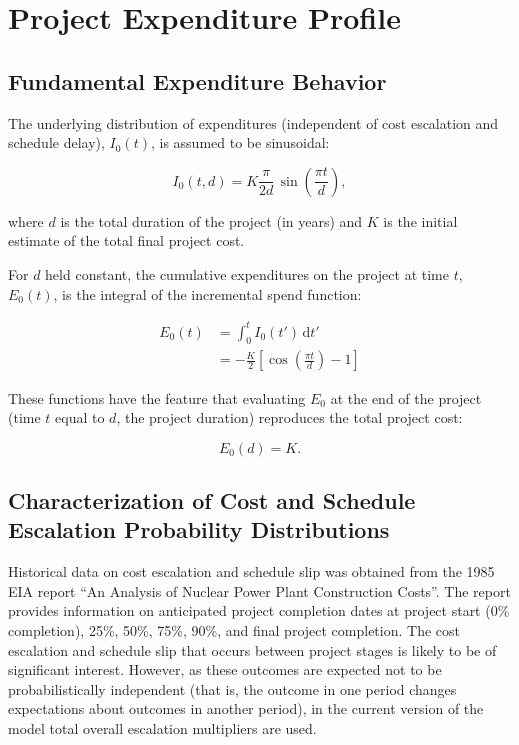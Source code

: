 \documentclass{article}
\begin{document}
\section{Project Expenditure Profile}

\subsection{Fundamental Expenditure Behavior}

The underlying distribution of expenditures (independent of cost escalation and schedule delay), $I_0(t)$, is assumed to be sinusoidal:

\begin{equation}
  I_0(t,d) = K \frac{\pi}{2d} \, \sin\left( \frac{\pi t}{d} \right),
\end{equation}

where $d$ is the total duration of the project (in years) and $K$ is the initial estimate of the total final project cost.

For $d$ held constant, the cumulative expenditures on the project at time $t$, $E_0(t)$, is the integral of the incremental spend function:

\begin{equation} \label{e0-def}
  \begin{split}
    E_0(t) & = \int_0^t {I_0(t') \, \mathrm{d}t'} \\
      & = - \frac{K}{2} \left[ \cos \left( \frac{\pi t}{d} \right) - 1 \right]
  \end{split}
\end{equation}

These functions have the feature that evaluating $E_0$ at the end of the project (time $t$ equal to $d$, the project duration) reproduces the total project cost:

\begin{equation}
  E_0(d) = K.
\end{equation}


\subsection{Characterization of Cost and Schedule Escalation Probability Distributions}
Historical data on cost escalation and schedule slip was obtained from the 1985 EIA report ``An Analysis of Nuclear Power Plant Construction Costs''.
The report provides information on anticipated project completion dates at project start (0\% completion), 25\%, 50\%, 75\%, 90\%, and final project completion.
The cost escalation and schedule slip that occurs between project stages is likely to be of significant interest.
However, as these outcomes are expected not to be probabilistically independent (that is, the outcome in one period changes expectations about outcomes in another period), in the current version of the model total overall escalation multipliers are used.
\end{document}
